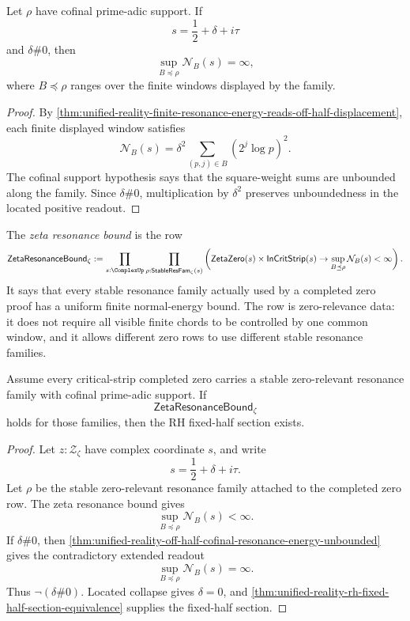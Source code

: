 \begin{theorem}
\label{thm:unified-reality-off-half-cofinal-resonance-energy-unbounded}
Let $\rho$ have cofinal prime-adic support.  If
$$
s=\frac12+\delta+i\tau
$$
and $\delta\#0$, then
$$
\sup_{B\preceq\rho}\mathcal N_B(s)=\infty,
$$
where $B\preceq\rho$ ranges over the finite windows displayed by the
family.
\end{theorem}

\begin{proof}
By
\autoref{thm:unified-reality-finite-resonance-energy-reads-off-half-displacement},
each finite displayed window satisfies
$$
\mathcal N_B(s)
=
\delta^2
\sum_{(p,j)\in B}(2^j\log p)^2.
$$
The cofinal support hypothesis says that the square-weight sums are
unbounded along the family.  Since $\delta\#0$, multiplication by
$\delta^2$ preserves unboundedness in the located positive readout.
\end{proof}

\begin{definition}
\label{def:unified-reality-zeta-resonance-bound}
The \emph{zeta resonance bound} is the row
$$
\mathsf{ZetaResonanceBound}_{\zeta}
:=
\prod_{s:\ComplexUp}
\prod_{\rho:\mathsf{StableResFam}_{\zeta}(s)}
\left(
\mathsf{ZetaZero}(s)
\times
\mathsf{InCritStrip}(s)
\to
\sup_{B\preceq\rho}\mathcal N_B(s)<\infty
\right).
$$
It says that every stable resonance family actually used by a completed
zero proof has a uniform finite normal-energy bound.  The row is
zero-relevance data: it does not require all visible finite chords to be
controlled by one common window, and it allows different zero rows to
use different stable resonance families.
\end{definition}

\begin{theorem}
\label{thm:unified-reality-zeta-resonance-bound-conditionally-sufficient}
Assume every critical-strip completed zero carries a stable
zero-relevant resonance family with cofinal prime-adic support.  If
$$
\mathsf{ZetaResonanceBound}_{\zeta}
$$
holds for those families, then the RH fixed-half section exists.
\end{theorem}

\begin{proof}
Let $z:\mathcal Z_{\zeta}$ have complex coordinate $s$, and write
$$
s=\frac12+\delta+i\tau.
$$
Let $\rho$ be the stable zero-relevant resonance family attached to the
completed zero row.  The zeta resonance bound gives
$$
\sup_{B\preceq\rho}\mathcal N_B(s)<\infty.
$$
If $\delta\#0$, then
\autoref{thm:unified-reality-off-half-cofinal-resonance-energy-unbounded}
gives the contradictory extended readout
$$
\sup_{B\preceq\rho}\mathcal N_B(s)=\infty.
$$
Thus $\neg(\delta\#0)$.  Located collapse gives $\delta=0$, and
\autoref{thm:unified-reality-rh-fixed-half-section-equivalence} supplies
the fixed-half section.
\end{proof}

